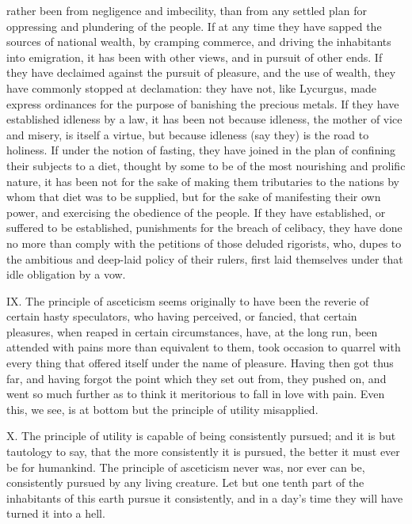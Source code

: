 \documentclass[12pt]{report}
\begin{document}
rather been from negligence and imbecility, than from any settled plan
for oppressing and plundering of the people. If at any time they have
sapped the sources of national wealth, by cramping commerce, and driving
the inhabitants into emigration, it has been with other views, and in
pursuit of other ends. If they have declaimed against the pursuit of
pleasure, and the use of wealth, they have commonly stopped at
declamation: they have not, like Lycurgus, made express ordinances for
the purpose of banishing the precious metals. If they have established
idleness by a law, it has been not because idleness, the mother of vice
and misery, is itself a virtue, but because idleness (say they) is the
road to holiness. If under the notion of fasting, they have joined in
the plan of confining their subjects to a diet, thought by some to be of
the most nourishing and prolific nature, it has been not for the sake of
making them tributaries to the nations by whom that diet was to be
supplied, but for the sake of manifesting their own power, and
exercising the obedience of the people. If they have established, or
suffered to be established, punishments for the breach of celibacy, they
have done no more than comply with the petitions of those deluded
rigorists, who, dupes to the ambitious and deep-laid policy of their
rulers, first laid themselves under that idle obligation by a vow.

IX. The principle of asceticism seems originally to have been the
reverie of certain hasty speculators, who having perceived, or fancied,
that certain pleasures, when reaped in certain circumstances, have, at
the long run, been attended with pains more than equivalent to them,
took occasion to quarrel with every thing that offered itself under the
name of pleasure. Having then got thus far, and having forgot the point
which they set out from, they pushed on, and went so much further as to
think it meritorious to fall in love with pain. Even this, we see, is at
bottom but the principle of utility misapplied.

X. The principle of utility is capable of being consistently pursued;
and it is but tautology to say, that the more consistently it is
pursued, the better it must ever be for humankind. The principle of
asceticism never was, nor ever can be, consistently pursued by any
living creature. Let but one tenth part of the inhabitants of this earth
pursue it consistently, and in a day's time they will have turned it
into a hell.
\end{document}

